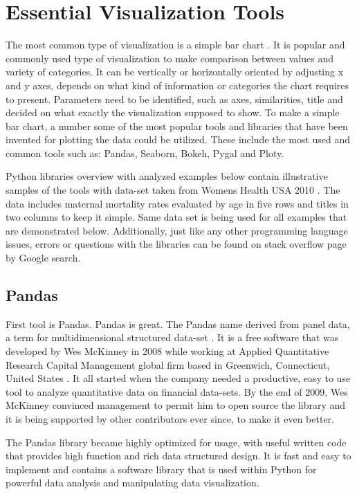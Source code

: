 \documentclass[sigconf]{acmart}
\begin{document}
\section{Essential Visualization Tools}

The most common type of visualization is a simple bar chart \cite{robbins2012creating}. It is popular and commonly used type of visualization to make comparison between values and variety of categories. It can be vertically or horizontally oriented by adjusting x and y axes, depends on what kind of information or categories the chart requires to  present. Parameters need to be identified, such as axes, similarities, title and decided on what exactly the visualization supposed to show. To make a simple bar chart, a number some of the most popular tools and libraries that have been invented for plotting the data could be utilized. These include the most used and common tools such as: Pandas, Seaborn, Bokeh,  Pygal and Ploty.

Python libraries overview with analyzed examples below contain illustrative samples of the tools with data-set taken from Women\textquotesingle s Health USA 2010 \cite{ogden2002centers}. The data includes maternal mortality rates evaluated by age in five rows and titles in two columns to keep it simple. Same data set is being used for all examples that are demonstrated below. Additionally, just like any other programming language issues, errors or questions with the libraries can be found on stack overflow page by Google search.

\subsection{Pandas}

First tool is Pandas. Pandas is great. The Pandas name derived from panel data, a term for multidimensional structured data-set \cite{mckinney2012python}. It is a free software that was developed by Wes McKinney in 2008 while working at Applied Quantitative Research Capital Management global firm based in Greenwich, Connecticut, United States \cite{mckinney2012python}. It all started when the company needed a productive, easy to use tool to analyze quantitative data on financial data-sets. By the end of 2009, Wes McKinney convinced management to permit him to open source the library and it is being supported by other contributors ever since, to make it even better.

The Pandas library became highly optimized for usage, with useful written code that provides high function and rich data structured design. It is fast and easy to implement and contains a software library that is used within Python for powerful data analysis and manipulating data visualization.
\end{document}

